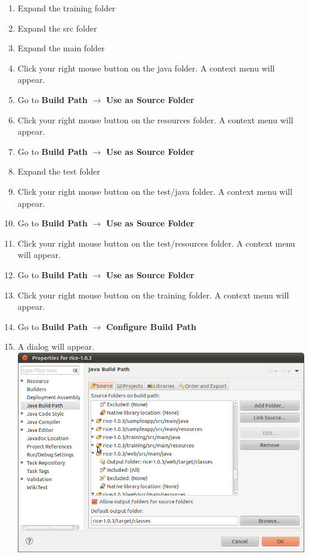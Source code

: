 \begin{enumerate}
  \item Expand the training folder
  \item Expand the src folder
  \item Expand the main folder
  \item Click your right mouse button on the java folder. A
    context menu will appear.
  \item Go to \textbf{Build Path} $\rightarrow$ \textbf{Use as Source
      Folder}
  \item Click your right mouse button on the resources folder. A
    context menu will appear.
  \item Go to \textbf{Build Path} $\rightarrow$ \textbf{Use as Source
      Folder}
  \item Expand the test folder
  \item Click your right mouse button on the test/java folder. A
    context menu will appear.
  \item Go to \textbf{Build Path} $\rightarrow$ \textbf{Use as Source
      Folder}
  \item Click your right mouse button on the test/resources folder. A
    context menu will appear.
  \item Go to \textbf{Build Path} $\rightarrow$ \textbf{Use as Source
      Folder}
  \item Click your right mouse button on the training folder. A
    context menu will appear.
  \item Go to \textbf{Build Path} $\rightarrow$ \textbf{Configure Build
      Path}
  \item A dialog will appear.\\
    \noindent \includegraphics[width=\textwidth]{images/Screenshot3.png}

\end{enumerate}
